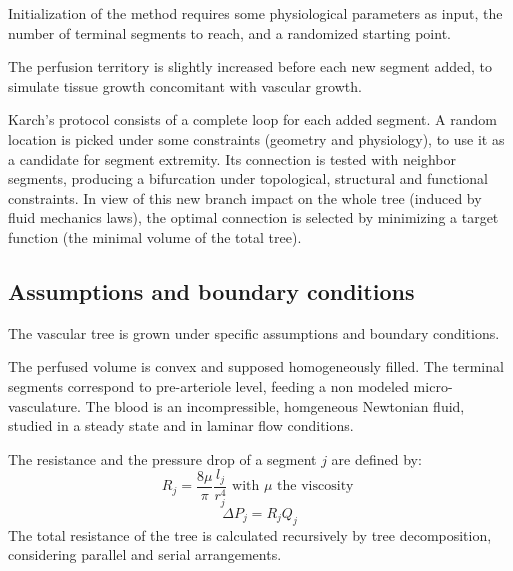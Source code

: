 \documentclass[a4paper, 11pt]{article} %
\begin{document}
Initialization of the method requires some physiological parameters as input, the number of terminal segments to reach, and a randomized starting point.

The perfusion territory is slightly increased before each new segment added, to simulate tissue growth concomitant with vascular growth.

Karch's protocol consists of a complete loop for each added segment. A  random location is picked under some constraints (geometry and physiology), to use it as a candidate for segment extremity. Its connection is tested with neighbor segments, producing a bifurcation under topological, structural and functional constraints. In view of this new branch impact on the whole tree (induced by fluid mechanics laws), the optimal connection is selected by minimizing a target function (the minimal volume of the total tree). 


\subsection{Assumptions and boundary conditions}
The vascular tree is grown under specific assumptions and boundary conditions.

The perfused volume is convex and supposed homogeneously filled. The terminal segments correspond to pre-arteriole level, feeding a non modeled micro-vasculature.
The blood is an incompressible, homgeneous Newtonian fluid, studied in a steady state and in laminar flow conditions. 

The resistance and the pressure drop of a segment $j$ are defined by:
\begin{equation}\label{resistance}
R_j = \frac{8\mu}{\pi}\frac{l_j}{r_j^4} \text{ with } \mu \text{ the viscosity }
\end{equation}
\begin{equation}\label{Pdrop}
\Delta P_j = R_j Q_j
\end{equation}
The total resistance of the tree is calculated recursively by tree decomposition, considering parallel and serial arrangements.
\end{document}
